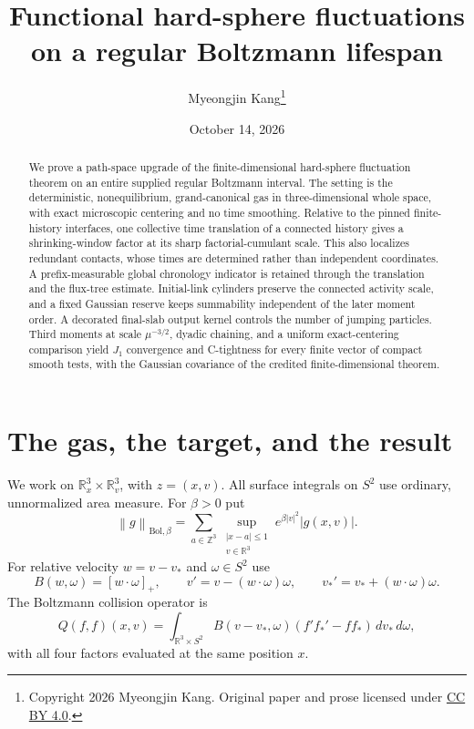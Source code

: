 \documentclass[11pt]{article}
\title{Functional hard-sphere fluctuations\texorpdfstring{\\}{ }on a regular Boltzmann lifespan}
\author{Myeongjin Kang\thanks{Copyright 2026 Myeongjin Kang. Original paper and prose licensed under \href{https://creativecommons.org/licenses/by/4.0/}{CC BY 4.0}.}}
\date{October 14, 2026}
\newcommand{\R}{\mathbb R}
\newcommand{\Bol}{\mathrm{Bol}}
\newcommand{\dd}{\,d}
\newcommand{\norm}[1]{\left\|#1\right\|}
\theoremstyle{definition}\newtheorem{definition}[theorem]{Definition}
\theoremstyle{remark}\newtheorem{remark}[theorem]{Remark}
\numberwithin{equation}{section}
\begin{document}
\maketitle
\begin{abstract}
We prove a path-space upgrade of the finite-dimensional hard-sphere
fluctuation theorem on an entire supplied regular Boltzmann interval.
The setting is the deterministic, nonequilibrium, grand-canonical gas in
three-dimensional whole space, with exact microscopic centering and no time
smoothing. Relative to the pinned finite-history interfaces, one collective
time translation of a connected history gives a shrinking-window factor at
its sharp factorial-cumulant scale. This also localizes redundant contacts,
whose times are determined rather than independent coordinates. A
prefix-measurable global chronology indicator is retained through the
translation and the flux-tree estimate. Initial-link cylinders preserve the
connected activity scale, and a fixed Gaussian reserve keeps summability
independent of the later moment order. A decorated final-slab output kernel
controls the number of jumping particles. Third moments at scale
$\mu^{-3/2}$, dyadic chaining, and a uniform exact-centering comparison yield
$J_1$ convergence and C-tightness for every finite vector of compact smooth
tests, with the Gaussian covariance of the credited finite-dimensional theorem.
\end{abstract}

\section{The gas, the target, and the result}\label{sec:statement}
We work on $\R_x^3\times\R_v^3$, with $z=(x,v)$. All surface integrals on
$S^2$ use ordinary, unnormalized area measure. For $\beta>0$ put
\begin{equation}\label{eq:bolnorm}
 \norm g_{\Bol,\beta}
 =\sum_{a\in\mathbb Z^3}
     \sup_{\substack{|x-a|\le1\\v\in\R^3}}
           e^{\beta|v|^2}|g(x,v)|.
\end{equation}
For relative velocity $w=v-v_*$ and $\omega\in S^2$ use
\begin{equation}\label{eq:collision}
 B(w,\omega)=[w\cdot\omega]_+,\qquad
 v'=v-(w\cdot\omega)\omega,\qquad
 v_*'=v_*+(w\cdot\omega)\omega.
\end{equation}
The Boltzmann collision operator is
\[
 Q(f,f)(x,v)=\int_{\R^3\times S^2}
       B(v-v_*,\omega)(f'f_*'-ff_*)\dd v_*\dd\omega,
\]
with all four factors evaluated at the same position $x$.
\end{document}
